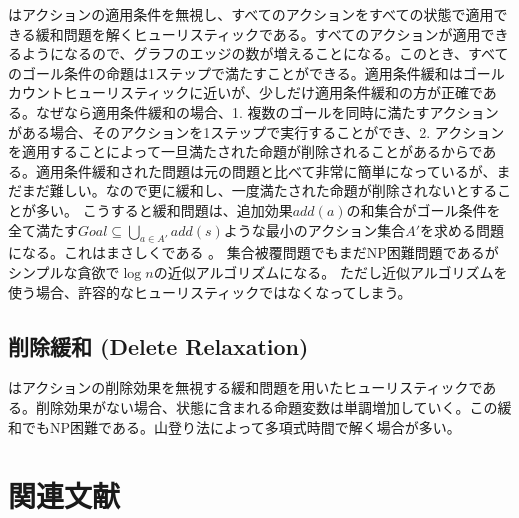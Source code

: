 はアクションの適用条件を無視し、すべてのアクションをすべての状態で適用できる緩和問題を解くヒューリスティックである。すべてのアクションが適用できるようになるので、グラフのエッジの数が増えることになる。このとき、すべてのゴール条件の命題は1ステップで満たすことができる。適用条件緩和はゴールカウントヒューリスティックに近いが、少しだけ適用条件緩和の方が正確である。なぜなら適用条件緩和の場合、1. 複数のゴールを同時に満たすアクションがある場合、そのアクションを1ステップで実行することができ、2. アクションを適用することによって一旦満たされた命題が削除されることがあるからである。適用条件緩和された問題は元の問題と比べて非常に簡単になっているが、まだまだ難しい。なので更に緩和し、一度満たされた命題が削除されないとすることが多い。
こうすると緩和問題は、追加効果$add(a)$の和集合がゴール条件を全て満たす$Goal \subseteq \bigcup_{a \in A'} add(s)$ような最小のアクション集合$A'$を求める問題になる。これはまさしくである \cite{karp1972reducibility}。
集合被覆問題でもまだNP困難問題であるがシンプルな貪欲で$\log n$の近似アルゴリズムになる\cite{chvatal1979greedy}。
ただし近似アルゴリズムを使う場合、許容的なヒューリスティックではなくなってしまう。


\subsection{削除緩和 (Delete Relaxation)}

はアクションの削除効果を無視する緩和問題を用いたヒューリスティックである。削除効果がない場合、状態に含まれる命題変数は単調増加していく。この緩和でもNP困難である。山登り法によって多項式時間で解く場合が多い。




\section{関連文献}

